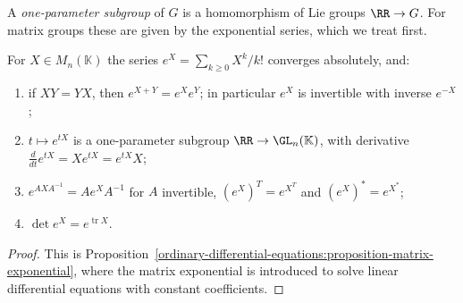 A \emph{one-parameter subgroup} of $G$ is a homomorphism of Lie groups $\RR \to G$. For matrix groups these are given by the exponential series, which we
treat first.

\begin{lemma}\label{lie-groups:lemma-matrix-exponential}
For $X \in M_n(\mathbb{K})$ the series $e^X = \sum_{k \geq 0}X^k/k!$ converges absolutely, and:
\begin{enumerate}
\item if $XY = YX$, then $e^{X+Y} = e^Xe^Y$; in particular $e^X$ is invertible with inverse $e^{-X}$;
\item $t \mapsto e^{tX}$ is a one-parameter subgroup $\RR \to \GL_n(\mathbb{K})$, with derivative $\frac{d}{dt}e^{tX} = Xe^{tX} = e^{tX}X$;
\item $e^{AXA^{-1}} = Ae^XA^{-1}$ for $A$ invertible, $(e^X)^T = e^{X^T}$ and $(e^X)^* = e^{X^*}$;
\item $\det e^X = e^{\operatorname{tr}X}$.
\end{enumerate}
\end{lemma}

\begin{proof}
This is Proposition~\ref{ordinary-differential-equations:proposition-matrix-exponential}, where the matrix exponential is introduced to solve linear differential equations with constant coefficients.
\end{proof}

